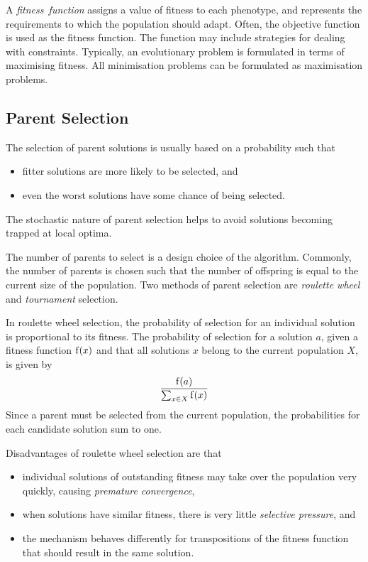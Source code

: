 A \emph{fitness~function} assigns a value of fitness to each phenotype, and represents the requirements to which the population should adapt.
Often, the objective function is used as the fitness function.
The function may include strategies for dealing with constraints.
Typically, an evolutionary problem is formulated in terms of maximising fitness.
All minimisation problems can be formulated as maximisation problems.

\subsection{Parent Selection}

The selection of parent solutions is usually based on a probability such that
\begin{itemize}
  \item fitter solutions are more likely to be selected, and
  \item even the worst solutions have some chance of being selected.
\end{itemize}
The stochastic nature of parent selection helps to avoid solutions becoming trapped at local optima.

The number of parents to select is a design choice of the algorithm.
Commonly, the number of parents is chosen such that the number of offspring is equal to the current size of the population.
Two methods of parent selection are \emph{roulette wheel} and \emph{tournament} selection.

In roulette wheel selection, the probability of selection for an individual solution is proportional to its fitness.
The probability of selection for a solution \( a \), given a fitness function \( \mathrm{f}\!\left( x \right) \) and that all solutions \( x \) belong to the current population \( X \), is given by
\begin{equation*}
  \frac{\mathrm{f}\!\left( a \right)}{\sum_{x \in X} \mathrm{f}\!\left( x \right)}
\end{equation*}
Since a parent must be selected from the current population, the probabilities for each candidate solution sum to one.

Disadvantages of roulette wheel selection are that
\begin{itemize}
  \item individual solutions of outstanding fitness may take over the population very quickly, causing \emph{premature convergence},
  \item when solutions have similar fitness, there is very little \emph{selective pressure}, and
  \item the mechanism behaves differently for transpositions of the fitness function that should result in the same solution.
\end{itemize}

